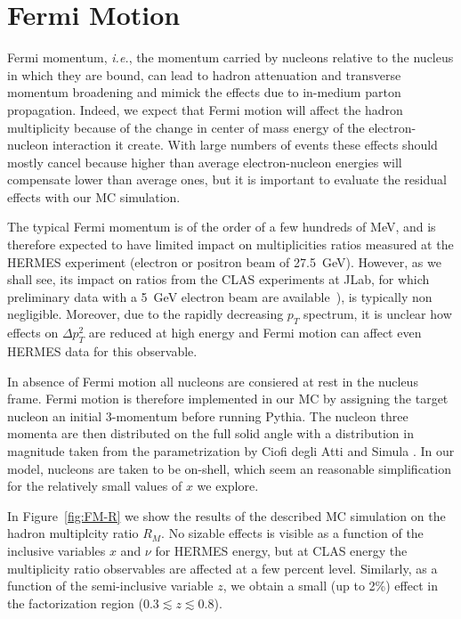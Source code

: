 \section{Fermi Motion}

Fermi momentum, {\em i.e.}, the momentum carried by nucleons relative to the nucleus in which they are bound, can lead to hadron attenuation and transverse momentum broadening and mimick the effects due to in-medium parton propagation.
Indeed, we expect that Fermi motion will affect the hadron multiplicity because of the change in center of mass energy of the electron-nucleon interaction it create. 
With large numbers of events these effects should mostly cancel because higher than average electron-nucleon energies will compensate lower than average ones, but it is important to evaluate the residual effects with our MC simulation. 

The typical Fermi momentum is of the order of a few hundreds of MeV, and is therefore expected to have limited impact on multiplicities ratios measured at the HERMES experiment (electron or positron beam of 27.5~GeV). However, as we shall see, its impact on ratios from the CLAS experiments at JLab, for which preliminary data with a 5~GeV electron beam are available~\cite{Brooks:2009xg,DupreQNP}), is typically non negligible. 
Moreover, due to the rapidly decreasing $p_T$ spectrum, it is unclear how effects on $\Delta p_T^2$ are reduced at high energy and Fermi motion can affect even HERMES data for this observable.

In absence of Fermi motion all nucleons are consiered at rest in the nucleus frame. 
Fermi motion is therefore implemented in our MC by assigning the target nucleon an initial 3-momentum before running Pythia. The nucleon three momenta are then distributed on the full solid angle with a distribution in magnitude taken from the parametrization by Ciofi degli Atti and Simula \cite{CiofidegliAtti:1995qe}.
In our model, nucleons are taken to be on-shell, which seem an reasonable simplification for the relatively small values of $x$ we explore.

In Figure~\ref{fig:FM-R} we show the results of the described MC simulation on the hadron multiplcity ratio $R_M$. No sizable effects is visible as a function of the inclusive variables $x$ and $\nu$ for HERMES energy, but at CLAS energy the multiplicity ratio observables are affected at a few percent level. Similarly, as a function of the semi-inclusive variable $z$, we obtain a small (up to 2\%) effect in the factorization region ($0.3 \lesssim z \lesssim0.8$). 

